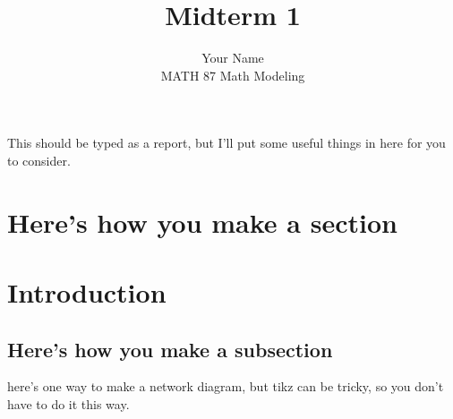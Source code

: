 \documentclass[11pt]{article}
\begin{document}
 

 
\title{Midterm 1}
\author{Your Name \\ 
MATH 87 Math Modeling} 

\maketitle
This should be typed as a report, but I'll put some useful things in here for you to consider.

\section{Here's how you make a section}
\section{Introduction}
\subsection{Here's how you make a subsection}




here's one way to make a network diagram, but tikz can be tricky, so you don't have to do it this way.
\end{document}
